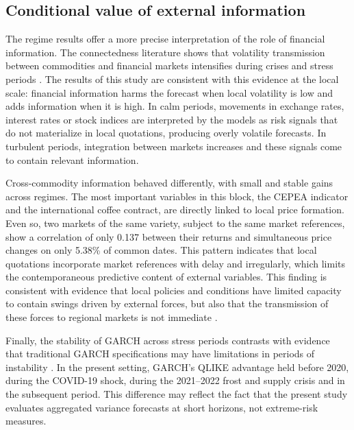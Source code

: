 \documentclass[a4paper,fleqn]{cas-sc}
\begin{document}
\subsection{Conditional value of external information}
\label{subsec:disc_conditional}

The regime results offer a more precise interpretation of the role of financial information. The connectedness literature shows that volatility transmission between commodities and financial markets intensifies during crises and stress periods \citep{Singh2026OilSoftCommoditySpillovers,Zhou2026CommodityConnectedness}. The results of this study are consistent with this evidence at the local scale: financial information harms the forecast when local volatility is low and adds information when it is high. In calm periods, movements in exchange rates, interest rates or stock indices are interpreted by the models as risk signals that do not materialize in local quotations, producing overly volatile forecasts. In turbulent periods, integration between markets increases and these signals come to contain relevant information.

Cross-commodity information behaved differently, with small and stable gains across regimes. The most important variables in this block, the CEPEA indicator and the international coffee contract, are directly linked to local price formation. Even so, two markets of the same variety, subject to the same market references, show a correlation of only 0.137 between their returns and simultaneous price changes on only 5.38\% of common dates. This pattern indicates that local quotations incorporate market references with delay and irregularly, which limits the contemporaneous predictive content of external variables. This finding is consistent with evidence that local policies and conditions have limited capacity to contain swings driven by external forces, but also that the transmission of these forces to regional markets is not immediate \citep{Fahmi2023LocalCoffeePolicy,AliagaMiranda2026CoffeeShocks}.

Finally, the stability of GARCH across stress periods contrasts with evidence that traditional GARCH specifications may have limitations in periods of instability \citep{Brun2026GARCHCoffeeRisk}. In the present setting, GARCH's QLIKE advantage held before 2020, during the COVID-19 shock, during the 2021--2022 frost and supply crisis and in the subsequent period. This difference may reflect the fact that the present study evaluates aggregated variance forecasts at short horizons, not extreme-risk measures.
\end{document}
